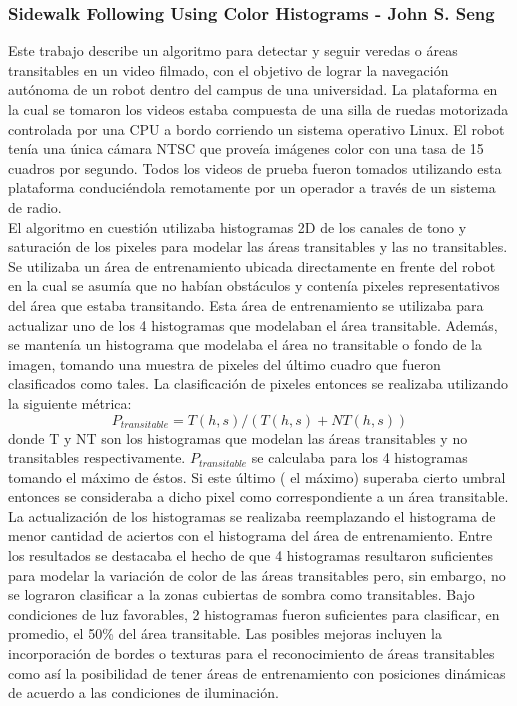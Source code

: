 	\subsubsection{\label{sec:sidewalk} Sidewalk Following Using Color Histograms - John S. Seng}
	Este trabajo describe un algoritmo  para detectar y seguir 
	veredas o \'areas transitables en un video filmado, con el objetivo de 
	lograr la navegaci\'on aut\'onoma de un robot dentro del 
	campus de una universidad. La plataforma en la cual se tomaron los 
	videos estaba 
	compuesta de una silla de ruedas motorizada controlada por una CPU 
	a bordo corriendo un sistema operativo Linux. El robot ten\'ia una 
	\'unica c\'amara NTSC que prove\'ia im\'agenes color con una tasa de 15 
	cuadros por segundo. Todos los videos de prueba fueron tomados 
	utilizando esta plataforma conduci\'endola remotamente por un 
	operador a trav\'es de un sistema de radio.\\
	\indent El algoritmo en cuesti\'on utilizaba histogramas 2D de los 
	canales de tono y saturaci\'on de los pixeles para modelar las \'areas
	transitables y las no transitables. Se utilizaba un \'area de 
	entrenamiento ubicada directamente en frente del robot en la cual se 
	asum\'ia que 
	no hab\'ian obst\'aculos y conten\'ia pixeles representativos del \'area que 
	estaba transitando. Esta \'area de entrenamiento se utilizaba para 
	actualizar uno de los 4 histogramas que modelaban el \'area 
	transitable. Adem\'as, se manten\'ia un histograma que modelaba el
	\'area no transitable o fondo de la imagen, tomando una muestra de pixeles del \'ultimo 
	cuadro que fueron clasificados como tales. La 
	clasificaci\'on de pixeles entonces se realizaba utilizando la 
	siguiente m\'etrica:
	\[
	P_{transitable}= T(h,s)/ ( T(h,s) + NT(h,s))
	\]
	donde T y NT son los histogramas que modelan las \'areas transitables
	y no transitables respectivamente. $P_{transitable}$ se calculaba para 
	los 4 histogramas tomando el m\'aximo de \'estos. Si este \'ultimo ( el 
	m\'aximo) superaba 
	cierto umbral entonces se consideraba a dicho pixel como 
	correspondiente a un \'area transitable.
	La actualizaci\'on de los histogramas se realizaba reemplazando el 
	histograma de menor cantidad de aciertos con el histograma 
	del \'area de entrenamiento.  Entre los resultados se destacaba el 
	hecho de que 4 histogramas resultaron suficientes para modelar la
	variaci\'on de color de las \'areas transitables pero, sin embargo, no 
	se lograron clasificar a la zonas cubiertas de sombra como transitables.
	Bajo condiciones de luz favorables, 2 histogramas fueron 
	suficientes para clasificar, en promedio, el 50\% del \'area 
	transitable. Las posibles mejoras incluyen la incorporaci\'on de 
	bordes o texturas para el reconocimiento de \'areas transitables 
	como as\'i la posibilidad de tener \'areas de entrenamiento con 
	posiciones din\'amicas de acuerdo a las condiciones de iluminaci\'on.
	
